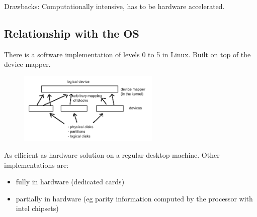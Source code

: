 Drawbacks: Computationally intensive, has to be hardware accelerated.

\subsection{Relationship with the OS}

There is a software implementation of levels 0 to 5 in Linux.
Built on top of the device mapper.

\begin{figure}[h!]
  \begin{center}
    \includegraphics[width=0.6\textwidth]{device_mapper.png}
  \end{center}
\end{figure}

As efficient as hardware solution on a regular desktop machine.
Other implementations are:

\begin{itemize}
  \item fully in hardware (dedicated cards)
  \item partially in hardware (eg parity information computed by the processor with intel chipsets)
\end{itemize}



